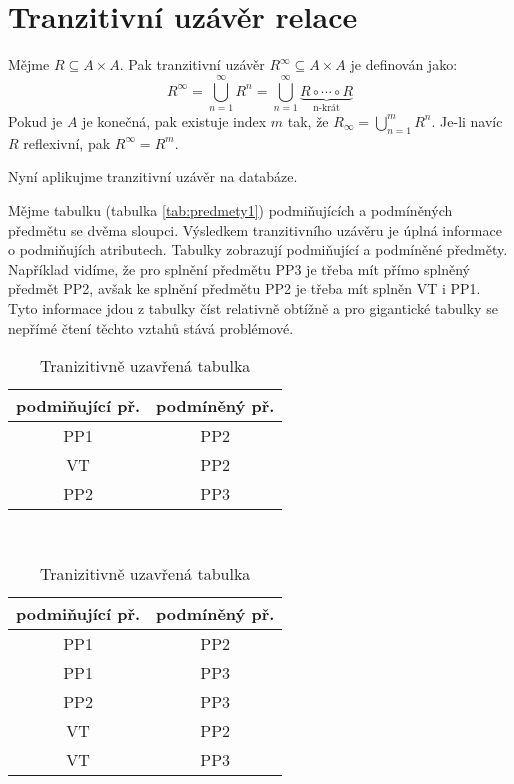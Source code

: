 \section{Tranzitivní uzávěr relace}
\begin{uptheorem}
Mějme $R \subseteq A \times A$. Pak tranzitivní uzávěr $R^{\infty} \subseteq A \times A$ je definován jako:
$$
R^{\infty} = \bigcup_{n = 1}^{\infty} R^{n} = \bigcup_{n = 1}^{\infty} \underbrace{R \circ \cdots \circ R}_{\text{n-krát}}
$$
Pokud je $A$ je konečná, pak existuje index $m$ tak, že $R_{\infty} = \bigcup_{n = 1}^{m} R^{n}$. Je-li  navíc $R$ reflexivní, pak $R^{\infty} = R^{m}$.
\end{uptheorem}
Nyní aplikujme tranzitivní uzávěr na databáze.
\begin{upexample}
Mějme tabulku (tabulka \ref{tab:predmety1}) podmiňujících a podmíněných předmětu se dvěma sloupci. Výsledkem tranzitivního uzávěru je úplná informace o podmiňujích atributech. Tabulky zobrazují podmiňující a podmíněné předměty. Například vidíme, že pro splnění předmětu PP3 je třeba mít přímo splněný předmět PP2, avšak ke splnění předmětu PP2 je třeba mít splněn VT i PP1. Tyto informace jdou z tabulky číst relativně obtížně a pro gigantické tabulky se nepřímé čtení těchto vztahů stává problémové.
\begin{table}
\caption{Tranzitivní uzávěr tabulky}\label{tab:predmety}
\begin{subtable}[t]{0.45\textwidth}
\centering
\caption{Výchozí tabulka}\label{tab:predmety1}
\begin{tabular}{c | c}
podmiňující př. & podmíněný př. \\
\hline
\rowcolor{green}PP1 & PP2 \\
\rowcolor{red}VT & PP2 \\
\rowcolor{yellow}PP2 & PP3
\end{tabular}
\end{subtable}
~
\begin{subtable}[t]{0.45\textwidth}
\centering
\caption{Tranizitivně uzavřená tabulka}\label{tab:predmety2}
\begin{tabular}{c | c}
podmiňující př. & podmíněný př. \\
\hline
\rowcolor{green}PP1 & PP2 \\
\cellcolor{green}PP1 & \cellcolor{yellow}PP3 \\
\rowcolor{yellow}PP2 & PP3 \\
\rowcolor{red}VT & PP2 \\
\cellcolor{red}VT & \cellcolor{yellow}PP3
\end{tabular}
\end{subtable}
\end{table}
\end{upexample}
